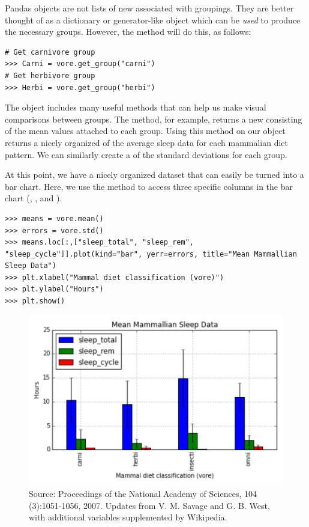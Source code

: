 Pandas  objects are not lists of new  associated with groupings.
They are better thought of as a dictionary or generator-like object which can be \emph{used} to produce the necessary groups.
However, the  method will do this, as follows:

\begin{lstlisting}
# Get carnivore group
>>> Carni = vore.get_group("carni")
# Get herbivore group
>>> Herbi = vore.get_group("herbi")
\end{lstlisting}

The  object includes many useful methods that can help us make visual comparisons between groups. 
The  method, for example, returns a new  consisting of the mean values attached to each group.
Using this method on our  object returns a nicely organized  of the average sleep data for each mammalian diet pattern.
We can similarly create a  of the standard deviations for each group.

At this point, we have a nicely organized dataset that can easily be turned into a bar chart.
Here, we use the  method to access three specific columns in the bar chart (, , and ).
\begin{lstlisting}
>>> means = vore.mean()
>>> errors = vore.std()
>>> means.loc[:,["sleep_total", "sleep_rem", "sleep_cycle"]].plot(kind="bar", yerr=errors, title="Mean Mammallian Sleep Data")
>>> plt.xlabel("Mammal diet classification (vore)")
>>> plt.ylabel("Hours")
>>> plt.show()
\end{lstlisting}

\begin{figure}[H] 
    \centering
    \includegraphics[width=.75\textwidth]{MeanMammal.pdf}
    \caption{Source:  Proceedings of the National Academy of Sciences, 104 (3):1051-1056, 2007. Updates from V. M. Savage and G. B. West, with additional variables supplemented by Wikipedia.}
    \label{fig:barplot}
\end{figure}

